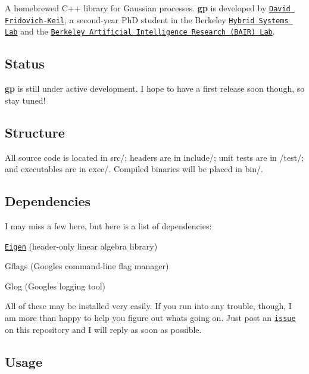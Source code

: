 \href{https://travis-ci.org/dfridovi/gp}{\tt } \href{https://github.com/dfridovi/gp/blob/master/LICENSE}{\tt }

A homebrewed C++ library for Gaussian processes. {\bfseries gp} is developed by \href{http://people.eecs.berkeley.edu/~dfk/}{\tt David Fridovich-\/\+Keil}, a second-\/year PhD student in the Berkeley \href{http://hybrid.eecs.berkeley.edu}{\tt Hybrid Systems Lab} and the \href{http://bair.berkeley.edu}{\tt Berkeley Artificial Intelligence Research (B\+A\+IR) Lab}.

\subsection*{Status}

{\bfseries gp} is still under active development. I hope to have a first release soon though, so stay tuned!

\subsection*{Structure}

All source code is located in {\ttfamily src/}; headers are in {\ttfamily include/}; unit tests are in {\ttfamily /test/}; and executables are in {\ttfamily exec/}. Compiled binaries will be placed in {\ttfamily bin/}.

\subsection*{Dependencies}

I may miss a few here, but here is a list of dependencies\+:


\begin{DoxyItemize}
\item \href{http://eigen.tuxfamily.org/dox/}{\tt Eigen} (header-\/only linear algebra library)
\item Gflags (Google\textquotesingle{}s command-\/line flag manager)
\item Glog (Google\textquotesingle{}s logging tool)
\end{DoxyItemize}

All of these may be installed very easily. If you run into any trouble, though, I am more than happy to help you figure out what\textquotesingle{}s going on. Just post an \href{https://github.com/dfridovi/gp/issues}{\tt issue} on this repository and I will reply as soon as possible.

\subsection*{Usage}

